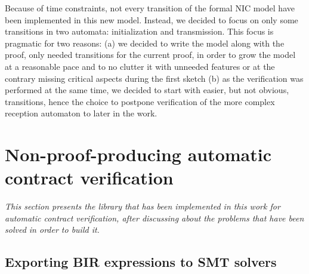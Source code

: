 \documentclass[10pt,a4paper]{article}
\begin{document}
\begin{multicols}{2}
Because of time constraints, not every transition of the formal NIC model have been implemented in this new model. Instead, we decided to focus on only some transitions in two automata: initialization and transmission. This focus is pragmatic for two reasons: (a) we decided to write the model along with the proof, only needed transitions for the current proof, in order to grow the model at a reasonable pace and to no clutter it with unneeded features or at the contrary missing critical aspects during the first sketch (b) as the verification was performed at the same time, we decided to start with easier, but not obvious, transitions, hence the choice to postpone verification of the more complex reception automaton to later in the work.

















































\section{Non-proof-producing automatic contract verification} \label{impl-non-pp-wp-lib}
\textit{This section presents the library that has been implemented in this work for automatic contract verification, after discussing about the problems that have been solved in order to build it.}

\subsection{Exporting BIR expressions to SMT solvers} \label{exporting-bir-to-smt}



\end{multicols}
\end{document}
